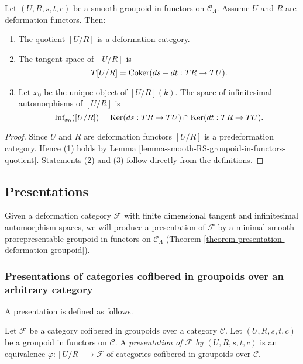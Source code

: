 \begin{lemma}
\label{lemma-deformation-groupoid-quotient}
Let $(U, R, s,t,c)$ be a smooth groupoid in functors on $\mathcal C_{\Lambda}$. 
Assume $U$ and $R$ are deformation functors. Then:
\begin{enumerate}
\item The quotient $[U/R]$ is a deformation category.
\item The tangent space of $[U/R]$ is 
\[ T[U/R] = \textnormal{Coker}(ds-dt: TR \rightarrow TU).
\]
\item Let $x_0$ be the unique object of $[U/R](k)$.  The space of infinitesimal 
automorphisms of $[U/R]$ is 
\[ \textnormal{Inf}_{x_0}([U/R]) = \textnormal{Ker}(ds: TR \rightarrow TU) \cap 
\textnormal{Ker}(dt: TR \rightarrow TU).  
\]
\end{enumerate}
\end{lemma}

\begin{proof}
Since $U$ and $R$ are deformation functors $[U/R]$ is a predeformation 
category. Hence (1) holds by Lemma 
\ref{lemma-smooth-RS-groupoid-in-functors-quotient}.  Statements (2) and (3) 
follow directly from the definitions.
\end{proof}

\subsection{Presentations}
\label{subsection-presentations}
Given a deformation category $\mathcal F$ with finite dimensional tangent and 
infinitesimal automorphism spaces, we will produce a presentation of $\mathcal 
F$ by a minimal smooth prorepresentable groupoid in functors on $\mathcal 
C_{\Lambda}$ (Theorem \ref{theorem-presentation-deformation-groupoid}). 

\subsubsection{Presentations of categories cofibered in groupoids over an 
arbitrary category}
A presentation is defined as follows.
\begin{definition}
Let $\mathcal F$ be a category cofibered in groupoids over a category $\mathcal 
C$.  Let $(U,R,s,t,c)$ be a groupoid in functors on $\mathcal C$.  A 
\emph{presentation of $\mathcal F$ by $(U,R,s,t,c)$} is an equivalence 
$\varphi: [U/R] \rightarrow \mathcal F$ of categories cofibered in groupoids 
over $\mathcal C$.
\end{definition}

